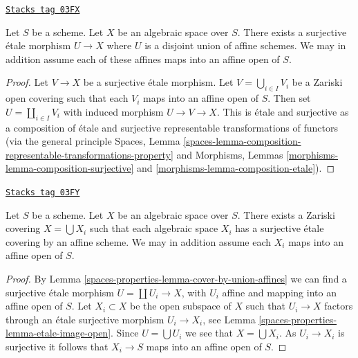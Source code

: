 \begin{lemma}
\label{spaces-properties-lemma-cover-by-union-affines}
\href{https://stacks.math.columbia.edu/tag/03FX}{\texttt{Stacks tag 03FX}}

Let $S$ be a scheme.
Let $X$ be an algebraic space over $S$.
There exists a surjective \'etale morphism $U \to X$ where
$U$ is a disjoint union of affine schemes.
We may in addition assume each of these affines
maps into an affine open of $S$.
\end{lemma}

\begin{proof}
Let $V \to X$ be a surjective \'etale morphism.
Let $V = \bigcup_{i \in I} V_i$ be a Zariski open covering
such that each $V_i$ maps into an affine open of $S$.
Then set $U = \coprod_{i \in I} V_i$ with induced morphism
$U \to V \to X$. This is \'etale and surjective as a composition
of \'etale and surjective representable
transformations of functors (via the general principle
Spaces, Lemma
\ref{spaces-lemma-composition-representable-transformations-property}
and
Morphisms, Lemmas \ref{morphisms-lemma-composition-surjective} and
\ref{morphisms-lemma-composition-etale}).
\end{proof}

\begin{lemma}
\label{spaces-properties-lemma-union-of-quasi-compact}
\href{https://stacks.math.columbia.edu/tag/03FY}{\texttt{Stacks tag 03FY}}

Let $S$ be a scheme.
Let $X$ be an algebraic space over $S$.
There exists a Zariski covering $X = \bigcup X_i$
such that each algebraic space $X_i$ has a surjective
\'etale covering by an affine scheme. We may in addition assume
each $X_i$ maps into an affine open of $S$.
\end{lemma}

\begin{proof}
By Lemma \ref{spaces-properties-lemma-cover-by-union-affines} we can find a surjective
\'etale morphism $U = \coprod U_i \to X$, with $U_i$ affine and mapping
into an affine open of $S$. Let $X_i \subset X$ be the open subspace
of $X$ such that $U_i \to X$ factors through an \'etale surjective morphism
$U_i \to X_i$, see
Lemma \ref{spaces-properties-lemma-etale-image-open}.
Since $U = \bigcup U_i$ we see that $X = \bigcup X_i$.
As $U_i \to X_i$ is surjective it follows that $X_i \to S$ maps into
an affine open of $S$.
\end{proof}


